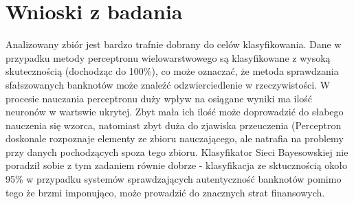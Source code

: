 \documentclass{classrep}
\begin{document}
\section{Wnioski z badania}
Analizowany zbiór jest bardzo trafnie dobrany do celów klasyfikowania. Dane w przypadku metody perceptronu wielowarstwowego są klasyfikowane z wysoką skutecznością (dochodząc do 100\%), co może oznaczać, że metoda sprawdzania sfałszowanych banknotów może znaleźć odzwierciedlenie w rzeczywistości. W procesie nauczania perceptronu duży wpływ na osiągane wyniki ma ilość neuronów w wartswie ukrytej. Zbyt mała ich ilość może doprowadzić do słabego nauczenia się wzorca, natomiast zbyt duża do zjawiska przeuczenia (Perceptron doskonale rozpoznaje elementy ze zbioru nauczającego, ale natrafia na problemy przy danych pochodzących spoza tego zbioru. Klasyfikator Sieci Bayesowskiej nie poradził sobie z tym zadaniem równie dobrze - klasyfikacja ze sktucznością około 95\% w przypadku systemów sprawdzających autentyczność banknotów pomimo tego że brzmi imponująco, może prowadzić do znacznych strat finansowych.
\end{document}
